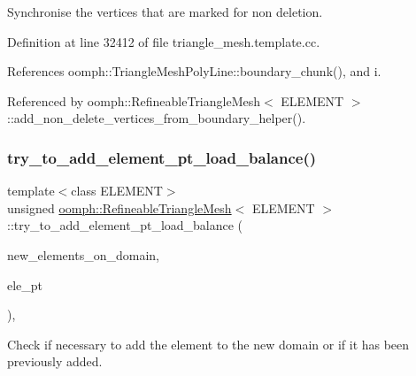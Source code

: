 Synchronise the vertices that are marked for non deletion. 



Definition at line 32412 of file triangle\+\_\+mesh.\+template.\+cc.



References oomph\+::\+Triangle\+Mesh\+Poly\+Line\+::boundary\+\_\+chunk(), and i.



Referenced by oomph\+::\+Refineable\+Triangle\+Mesh$<$ E\+L\+E\+M\+E\+N\+T $>$\+::add\+\_\+non\+\_\+delete\+\_\+vertices\+\_\+from\+\_\+boundary\+\_\+helper().

\mbox{\label{classoomph_1_1RefineableTriangleMesh_ab7a6b91dd228553391d1c666c1e78353}} 
\subsubsection{\texorpdfstring{try\+\_\+to\+\_\+add\+\_\+element\+\_\+pt\+\_\+load\+\_\+balance()}{try\_to\_add\_element\_pt\_load\_balance()}}
{\footnotesize\ttfamily template$<$class E\+L\+E\+M\+E\+NT$>$ \\
unsigned \hyperlink{classoomph_1_1RefineableTriangleMesh}{oomph\+::\+Refineable\+Triangle\+Mesh}$<$ E\+L\+E\+M\+E\+NT $>$\+::try\+\_\+to\+\_\+add\+\_\+element\+\_\+pt\+\_\+load\+\_\+balance (\begin{DoxyParamCaption}\item[{\hyperlink{classoomph_1_1Vector}{Vector}$<$ \hyperlink{classoomph_1_1FiniteElement}{Finite\+Element} $\ast$$>$ \&}]{new\+\_\+elements\+\_\+on\+\_\+domain,  }\item[{\hyperlink{classoomph_1_1FiniteElement}{Finite\+Element} $\ast$\&}]{ele\+\_\+pt }\end{DoxyParamCaption})\hspace{0.3cm}{\ttfamily [inline]}, {\ttfamily [protected]}}



Check if necessary to add the element to the new domain or if it has been previously added. 



